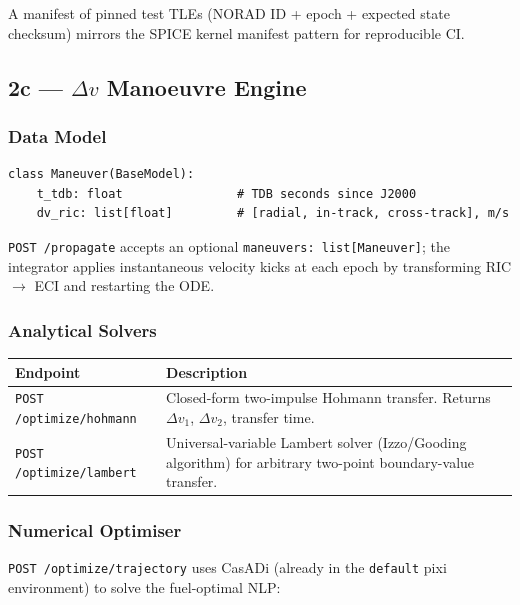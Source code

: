 \documentclass[11pt, a4paper]{article}
\begin{document}
A manifest of pinned test TLEs (NORAD ID + epoch + expected state checksum)
mirrors the SPICE kernel manifest pattern for reproducible CI.

\subsection{2c — $\Delta v$ Manoeuvre Engine}

\subsubsection{Data Model}

\begin{verbatim}
class Maneuver(BaseModel):
    t_tdb: float                # TDB seconds since J2000
    dv_ric: list[float]         # [radial, in-track, cross-track], m/s
\end{verbatim}

\texttt{POST /propagate} accepts an optional \texttt{maneuvers: list[Maneuver]};
the integrator applies instantaneous velocity kicks at each epoch by
transforming RIC $\to$ ECI and restarting the ODE.

\subsubsection{Analytical Solvers}

\begin{center}
\begin{tabular}{L{3.5cm} L{9cm}}
  \toprule
  \textbf{Endpoint} & \textbf{Description} \\
  \midrule
  \texttt{POST /optimize/hohmann}  &
    Closed-form two-impulse Hohmann transfer. Returns $\Delta v_1$,
    $\Delta v_2$, transfer time. \\[4pt]
  \texttt{POST /optimize/lambert}  &
    Universal-variable Lambert solver (Izzo/Gooding algorithm) for
    arbitrary two-point boundary-value transfer. \\
  \bottomrule
\end{tabular}
\end{center}

\subsubsection{Numerical Optimiser}

\texttt{POST /optimize/trajectory} uses CasADi (already in the \texttt{default}
pixi environment) to solve the fuel-optimal NLP:
\end{document}

